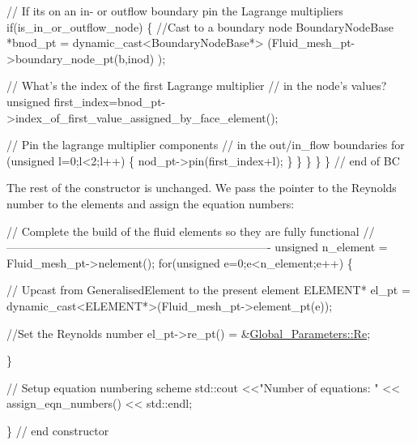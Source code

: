 \begin{DoxyCodeInclude}


       \textcolor{comment}{// If its on an in- or outflow boundary pin the Lagrange multipliers}
       \textcolor{keywordflow}{if}(is\_in\_or\_outflow\_node)
        \{
         \textcolor{comment}{//Cast to a boundary node}
         BoundaryNodeBase *bnod\_pt = 
          \textcolor{keyword}{dynamic\_cast<}BoundaryNodeBase*\textcolor{keyword}{>}
          (Fluid\_mesh\_pt->boundary\_node\_pt(b,inod) );
         
         \textcolor{comment}{// What's the index of the first Lagrange multiplier}
         \textcolor{comment}{// in the node's values? }
         \textcolor{keywordtype}{unsigned} first\_index=bnod\_pt->index\_of\_first\_value\_assigned\_by\_face\_element();
         
         \textcolor{comment}{// Pin the lagrange multiplier components }
         \textcolor{comment}{// in the out/in\_flow boundaries}
         \textcolor{keywordflow}{for} (\textcolor{keywordtype}{unsigned} l=0;l<2;l++)
          \{
           nod\_pt->pin(first\_index+l);
          \}
        \}
      \}
    \}
  \} \textcolor{comment}{// end of BC }

\end{DoxyCodeInclude}


The rest of the constructor is unchanged. We pass the pointer to the Reynolds number to the elements and assign the equation numbers\+:


\begin{DoxyCodeInclude}

 \textcolor{comment}{// Complete the build of the fluid elements so they are fully functional}
 \textcolor{comment}{//----------------------------------------------------------------------}
 \textcolor{keywordtype}{unsigned} n\_element = Fluid\_mesh\_pt->nelement();
 \textcolor{keywordflow}{for}(\textcolor{keywordtype}{unsigned} e=0;e<n\_element;e++)
  \{

   \textcolor{comment}{// Upcast from GeneralisedElement to the present element}
   ELEMENT* el\_pt = \textcolor{keyword}{dynamic\_cast<}ELEMENT*\textcolor{keyword}{>}(Fluid\_mesh\_pt->element\_pt(e));
   
   \textcolor{comment}{//Set the Reynolds number}
   el\_pt->re\_pt() = &\hyperlink{namespaceGlobal__Parameters_a9d72e94a9305c6a310940a6a427ebe06}{Global\_Parameters::Re};   

  \} 
 
 \textcolor{comment}{// Setup equation numbering scheme}
 std::cout <<\textcolor{stringliteral}{"Number of equations: "} << assign\_eqn\_numbers() << std::endl; 
 
\} \textcolor{comment}{// end constructor}

\end{DoxyCodeInclude}




